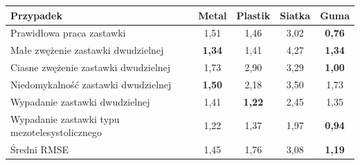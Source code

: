 \begin{tabular}{lcccc}
\toprule
Przypadek & Metal & Plastik & Siatka & Guma \\
\midrule
Prawidłowa praca zastawki & 1,51 & 1,46 & 3,02 & \textbf{0,76} \\
Małe zwężenie zastawki dwudzielnej & \textbf{1,34} & 1,41 & 4,27 & \textbf{1,34} \\
Ciasne zwężenie zastawki dwudzielnej & 1,73 & 2,90 & 3,29 & \textbf{1,00} \\
Niedomykalność zastawki dwudzielnej & \textbf{1,50} & 2,18 & 3,50 & 1,73 \\
Wypadanie zastawki dwudzielnej & 1,41 & \textbf{1,22} & 2,45 & 1,35 \\
Wypadanie zastawki typu mezotelesystolicznego & 1,22 & 1,37 & 1,97 & \textbf{0,94} \\
\midrule
Średni RMSE & 1,45 & 1,76 & 3,08 & \textbf{1,19} \\
\bottomrule
\end{tabular}
